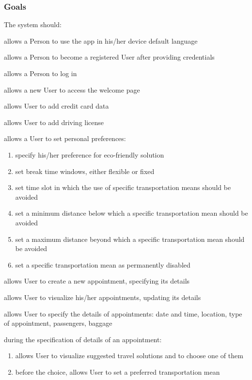\subsubsection{Goals}
The system should:
	\begin{enumerate}[label={[G\arabic*]}]
		\item allows a Person to use the app in his/her device default language
		\item allows a Person to become a registered User after providing credentials
		\item allows a Person to log in
		\item allows a new User to access the welcome page
		\item allows User to add credit card data
		\item allows User to add driving license
		\item allows a User to set personal preferences:
		\begin{enumerate}[label=\theenumi\#{\arabic*}]
			\item specify his/her preference for eco-friendly solution
			\item set break time windows, either flexible or fixed
			\item set time slot in which the use of specific transportation means should be avoided
			\item set a minimum distance below which a specific transportation mean should be avoided
			\item set a maximum distance beyond which a specific transportation mean should be avoided
			\item set a specific transportation mean as permanently disabled
		\end{enumerate}
		\item allows User to create a new appointment, specifying its details
		\item allows User to visualize his/her appointments, updating its details
		\item allows User to specify the details of appointments: date and time, location, type of appointment, passengers, baggage
		\item during the specification of details of an appointment:
		\begin{enumerate}[label=\theenumi\#{\arabic*}]
			\item allows User to visualize suggested travel solutions and to choose one of them
			\item before the choice, allows User to set a preferred transportation mean

\end{enumerate}
\end{enumerate}
